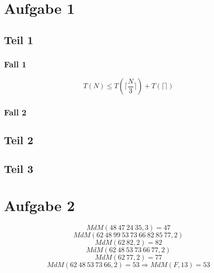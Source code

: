 \documentclass[10pt,a4paper]{article}
\begin{document}
\section{Aufgabe 1}

\subsection{Teil 1}

\subsubsection{Fall 1}
\begin{equation}
  T(N) \le T(\lceil \frac{N}{3} \rceil) + T(\lceil  \rceil)
\end{equation}

\subsubsection{Fall 2}

\subsection{Teil 2}

\subsection{Teil 3}

\section{Aufgabe 2}

\begin{equation}
  MdM(48\ 47\ 24\ 35, 3) = 47
\end{equation}
\begin{equation}
  MdM(62\ 48\ 99\ 53\ 73\ 66\ 82\ 85\ 77, 2)
\end{equation}
\begin{equation}
  MdM(62\ 82, 2) = 82
\end{equation}
\begin{equation}
  MdM(62\ 48\ 53\ 73\ 66\ 77, 2)
\end{equation}
\begin{equation}
  MdM(62\ 77, 2) = 77
\end{equation}
\begin{equation}
  MdM(62\ 48\ 53\ 73\ 66, 2) = 53 \Rightarrow MdM(F, 13) = 53
\end{equation}
\end{document}
